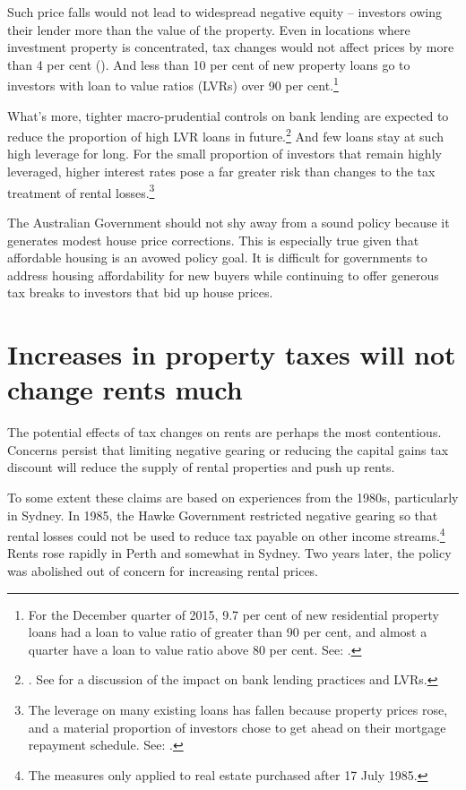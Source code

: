 Such price falls would not lead to widespread negative equity – investors owing their lender more than the value of the property. Even in locations where investment property is concentrated, tax changes would not affect prices by more than 4 per cent (). And less than 10 per cent of new property loans go to investors with loan to value ratios (LVRs) over 90 per cent.\footnote{For the December quarter of 2015, 9.7 per cent of new residential property loans had a loan to value ratio of greater than 90 per cent, and almost a quarter have a loan to value ratio above 80 per cent. See: \textcite{APRA2016PropertyExposures}.}

What’s more, tighter macro-prudential controls on bank lending are expected to reduce the proportion of high LVR loans in future.\footnote{\textcite{APRA2014a}. See \textcite{Schlesinger2015} for a discussion of the impact on bank lending practices and LVRs.}  
  And few loans stay at such high leverage for long.  For the small proportion of investors that remain highly leveraged, higher interest rates pose a far greater risk than changes to the tax treatment of rental losses.\footnote{The leverage on many existing loans has fallen because property prices rose, and a material proportion of investors chose to get ahead on their mortgage repayment schedule. See: \textcite{RBA2015StatsMarginLending}.} 

The Australian Government should not shy away from a sound policy because it generates modest house price corrections. 
This is especially true given that affordable housing is an avowed policy goal. It is difficult for governments to address housing affordability for new buyers while continuing to offer generous tax breaks to investors that bid up house prices. 

\section{Increases in property taxes will not change rents much}\label{sec:Increases-property-taxes-will-not-change-rents}
The potential effects of tax changes on rents are perhaps the most contentious. Concerns persist that limiting negative gearing or reducing the capital gains tax discount will reduce the supply of rental properties and push up rents. 

To some extent these claims are based on experiences from the 1980s, particularly in Sydney. 
In 1985, the Hawke Government restricted negative gearing so that rental losses could not be used to reduce tax payable on other income streams.\footnote{\textcite[][20]{McKellInstitute2015SwitchingGears}  The measures only applied to real estate purchased after 17 July 1985.}
Rents rose rapidly in Perth and somewhat in Sydney. 
Two years later, the policy was abolished out of concern for increasing rental prices. 

